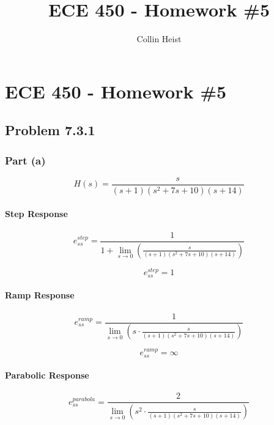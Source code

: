 \documentclass[11pt]{article}
\author{Collin Heist}
\title{ECE 450 - Homework \#5}
\begin{document}
    
    
    \maketitle
    
    

    
    \hypertarget{ece-450---homework-5}{%
\section{ECE 450 - Homework \#5}\label{ece-450---homework-5}}

\hypertarget{problem-7.3.1}{%
\subsection{Problem 7.3.1}\label{problem-7.3.1}}

\hypertarget{part-a}{%
\subsubsection{Part (a)}\label{part-a}}

\[H(s)=\frac{s}{(s+1)(s^2+7s+10)(s+14)}\]

\hypertarget{step-response}{%
\paragraph{Step Response}\label{step-response}}

\[e_{ss}^{step}=\frac{1}{1+\lim_{s\to 0}(\frac{s}{(s+1)(s^2+7s+10)(s+14)})}\]

\[e_{ss}^{step}=1\]

\hypertarget{ramp-response}{%
\paragraph{Ramp Response}\label{ramp-response}}

\[e_{ss}^{ramp}=\frac{1}{\lim_{s\to 0}(s\cdot \frac{s}{(s+1)(s^2+7s+10)(s+14)})}\]

\[e_{ss}^{ramp}=\infty\]

\hypertarget{parabolic-response}{%
\paragraph{Parabolic Response}\label{parabolic-response}}

\[e_{ss}^{parabola}=\frac{2}{\lim_{s\to 0}(s^2\cdot \frac{s}{(s+1)(s^2+7s+10)(s+14)})}\]
\end{document}
